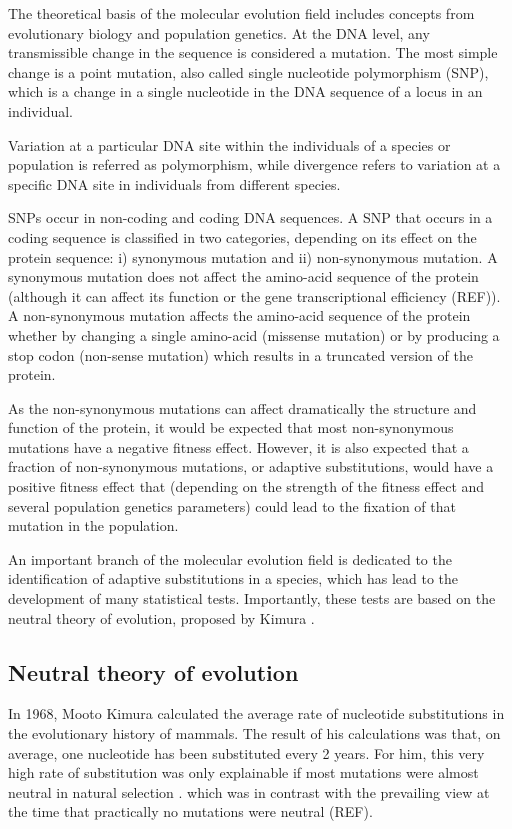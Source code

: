 The theoretical basis of the molecular evolution field includes concepts from evolutionary biology and population genetics. At the DNA level, any transmissible change in the sequence is considered a mutation. 
The most simple change is a point mutation, also called single nucleotide polymorphism (SNP),
which is a change in a single nucleotide in the DNA sequence of a locus in an individual.

Variation at a particular DNA site within the individuals of a species or population is referred as polymorphism, while divergence refers to variation at a specific DNA site in individuals from different species.

SNPs occur in non-coding and coding DNA sequences. A SNP that occurs in a coding sequence is classified in two categories, depending on its effect on the protein sequence: i) synonymous mutation and ii) non-synonymous mutation.
A synonymous mutation does not affect the amino-acid sequence of the protein (although it can affect its function 
	\citealp{Kimchi-Sarfaty2007} or the gene transcriptional efficiency (REF)).
A non-synonymous mutation affects the amino-acid sequence of the protein whether by changing a single amino-acid (missense mutation) or by producing a stop codon (non-sense mutation) which results in a truncated version of the protein.

As the non-synonymous mutations can affect dramatically the structure and function of the protein, it would be expected that most non-synonymous mutations have a negative fitness effect.
However, it is also expected that a fraction of non-synonymous mutations, or adaptive substitutions, would have a positive fitness effect that (depending on the strength of the fitness effect and several population genetics parameters) could lead to the fixation of that mutation in the population.

An important branch of the molecular evolution field is dedicated to the identification of adaptive substitutions in a species, which has lead to the development of many statistical tests. 
Importantly, these tests are based on the neutral theory of evolution, proposed by Kimura
	\citep{Kimura1968}.

\subsection{Neutral theory of evolution}
In 1968, Mooto Kimura calculated the average rate of nucleotide substitutions in the evolutionary history of mammals.
The result of his calculations was that, on average, one nucleotide has been substituted every 2 years.
For him, this very high rate of substitution was only explainable if most mutations were almost neutral in natural selection 
	\citep{Kimura1968}.
which was in contrast with the prevailing view at the time that practically no mutations were neutral (REF).

